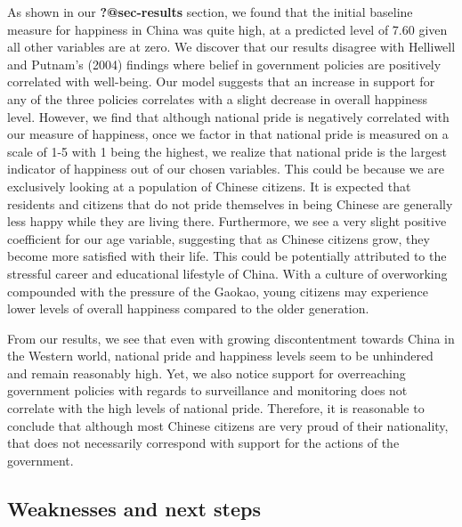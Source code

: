 \documentclass[
  letterpaper,
  DIV=11,
  numbers=noendperiod]{scrartcl}
\begin{document}
As shown in our \textbf{?@sec-results} section, we found that the
initial baseline measure for happiness in China was quite high, at a
predicted level of 7.60 given all other variables are at zero. We
discover that our results disagree with Helliwell and Putnam's (2004)
findings where belief in government policies are positively correlated
with well-being. Our model suggests that an increase in support for any
of the three policies correlates with a slight decrease in overall
happiness level. However, we find that although national pride is
negatively correlated with our measure of happiness, once we factor in
that national pride is measured on a scale of 1-5 with 1 being the
highest, we realize that national pride is the largest indicator of
happiness out of our chosen variables. This could be because we are
exclusively looking at a population of Chinese citizens. It is expected
that residents and citizens that do not pride themselves in being
Chinese are generally less happy while they are living there.
Furthermore, we see a very slight positive coefficient for our age
variable, suggesting that as Chinese citizens grow, they become more
satisfied with their life. This could be potentially attributed to the
stressful career and educational lifestyle of China. With a culture of
overworking compounded with the pressure of the Gaokao, young citizens
may experience lower levels of overall happiness compared to the older
generation.

From our results, we see that even with growing discontentment towards
China in the Western world, national pride and happiness levels seem to
be unhindered and remain reasonably high. Yet, we also notice support
for overreaching government policies with regards to surveillance and
monitoring does not correlate with the high levels of national pride.
Therefore, it is reasonable to conclude that although most Chinese
citizens are very proud of their nationality, that does not necessarily
correspond with support for the actions of the government.

\hypertarget{weaknesses-and-next-steps}{%
\subsection{Weaknesses and next steps}\label{weaknesses-and-next-steps}}
\end{document}
